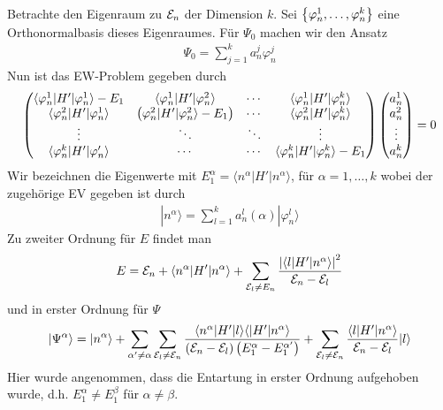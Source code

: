 Betrachte den Eigenraum zu $\mathcal{E}_n$ der Dimension $k$. Sei $\left\{ 
\varphi_n^1 , \dots , \varphi_n^k \right\}$ eine Orthonormalbasis dieses Eigenraumes.
Für $\Psi_0$ machen wir den Ansatz
\begin{align*}
    \Psi_0 = \sum_{j=1}^k a_n^j \varphi_n^j
\end{align*}
Nun ist das EW-Problem gegeben durch
\begin{align*}
    \begin{pmatrix}
        \langle \varphi_n^1 | H' | \varphi_n^1 \rangle - E_1 & \langle \varphi_n^1 | H' | \varphi_n^2 \rangle & \dotsb & \langle \varphi_n^1 | H' | \varphi_n^k \rangle \\
        \langle \varphi_n^2 | H' | \varphi_n^1 \rangle & \left( \varphi_n^2 | H' | \varphi_n^2 \rangle - E_1 \right) & \dotsb & \langle \varphi_n^2 | H' | \varphi_n^k \rangle \\
        \vdots & \ddots & \ddots & \vdots \\
        \langle \varphi_n^k | H' | \varphi_n' \rangle & \dotsb & \dotsb & \langle \varphi_n^k | H' | \varphi_n^k \rangle - E_1
    \end{pmatrix}
    \begin{pmatrix}
        a_n^1 \\ a_n^2 \\ \vdots \\ a_n^k
    \end{pmatrix}
    =0
\end{align*}
Wir bezeichnen die Eigenwerte mit $E_1^\alpha = \langle n^\alpha | H' | n^\alpha \rangle$,
für $\alpha = 1,\dots,k$ wobei der zugehörige EV gegeben ist durch
\begin{align*}
    |n^\alpha \rangle = \sum_{l=1}^k a_n^l (\alpha) |\varphi_n^l \rangle
\end{align*}
Zu zweiter Ordnung für $E$ findet man
\begin{align*}
    E = \mathcal{E}_n + \langle n^\alpha | H' | n^\alpha \rangle
    + \sum_{\mathcal{E}_l \neq E_n} \frac{\left\vert \langle l | H' | n^\alpha \rangle \right\vert^2}{\mathcal{E}_n - \mathcal{E}_l}
\end{align*}
und in erster Ordnung für $\Psi$
\begin{align*}
    |\Psi^\alpha \rangle = |n^\alpha \rangle + \sum_{\alpha' \neq \alpha}
    \sum_{\mathcal{E}_l \neq \mathcal{E}_n} \frac{\langle n^\alpha | H' | l \rangle \langle | H' | n^\alpha \rangle}{\left( \mathcal{E}_n - \mathcal{E}_l \right) \left( E_1^\alpha - E_1^{\alpha'} \right)}
    + \sum_{\mathcal{E}_l \neq \mathcal{E}_n} \frac{\langle l | H' | n^\alpha \rangle}{\mathcal{E}_n - \mathcal{E}_l} |l\rangle
\end{align*}
Hier wurde angenommen, dass die Entartung in erster Ordnung aufgehoben wurde, d.h.
$E_1^\alpha \neq E_1^\beta$ für $\alpha \neq \beta$.

